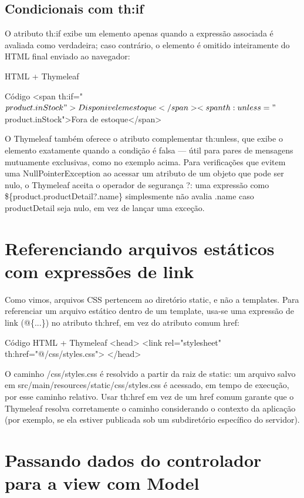 \subsection{Condicionais com th:if}

O atributo th:if exibe um elemento apenas quando a expressão associada é avaliada como verdadeira; caso contrário, o elemento é omitido inteiramente do HTML final enviado ao navegador:

HTML + Thymeleaf

\begin{codebox}{Código}
<span th:if="${product.inStock}">Disponivel em estoque</span>
<span th:unless="${product.inStock}">Fora de estoque</span>
\end{codebox}

O Thymeleaf também oferece o atributo complementar th:unless, que exibe o elemento exatamente quando a condição é falsa — útil para pares de mensagens mutuamente exclusivas, como no exemplo acima. Para verificações que evitem uma NullPointerException ao acessar um atributo de um objeto que pode ser nulo, o Thymeleaf aceita o operador de segurança ?: uma expressão como \$\{product.productDetail?.name\} simplesmente não avalia .name caso productDetail seja nulo, em vez de lançar uma exceção.

\section{Referenciando arquivos estáticos com expressões de link}

Como vimos, arquivos CSS pertencem ao diretório static, e não a templates. Para referenciar um arquivo estático dentro de um template, usa-se uma expressão de link (@\{...\}) no atributo th:href, em vez do atributo comum href:

\begin{codebox}{Código}
HTML + Thymeleaf
<head>
<link rel="stylesheet" th:href="@{/css/styles.css}">
</head>
\end{codebox}

O caminho /css/styles.css é resolvido a partir da raiz de static: um arquivo salvo em src/main/resources/static/css/styles.css é acessado, em tempo de execução, por esse caminho relativo. Usar th:href em vez de um href comum garante que o Thymeleaf resolva corretamente o caminho considerando o contexto da aplicação (por exemplo, se ela estiver publicada sob um subdiretório específico do servidor).

\section{Passando dados do controlador para a view com Model}

